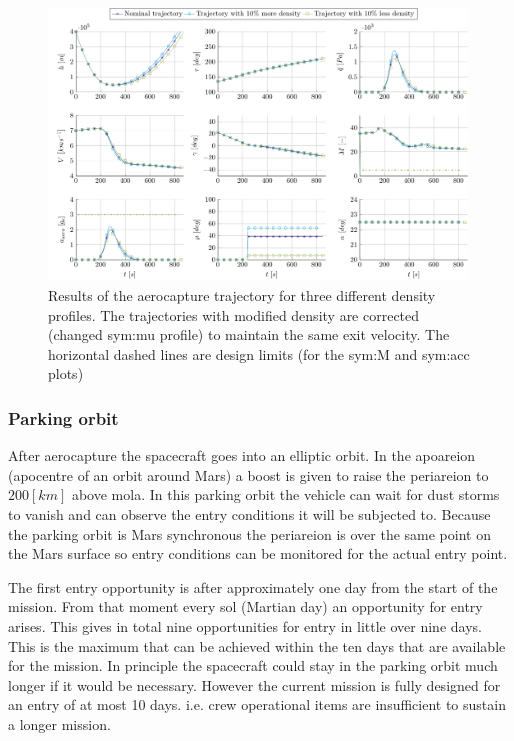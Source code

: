 \begin{figure}
	\centering
	\includegraphics[width=0.99\textwidth]{Figure/Orbit/sensitivity_aerocapture.pdf}
	\caption[Results of the aerocapture trajectory for three different density profiles]{Results of the aerocapture trajectory for three different density profiles. The trajectories with modified density are corrected (changed \gls{sym:mu} profile) to maintain the same exit velocity. The horizontal dashed lines are design limits (for the \gls{sym:M} and \gls{sym:acc} plots) }
	\label{fig:orbit_aerocapture_data}
\end{figure}

\subsubsection{Parking orbit}\label{sec:parking_orbit}
After aerocapture the spacecraft goes into an elliptic orbit. In the apoareion (apocentre of an orbit around Mars) a boost is given to raise the periareion to $200 \left[km\right]$ above \gls{mola}. In this parking orbit the vehicle can wait for dust storms to vanish and can observe the entry conditions it will be subjected to. Because the parking orbit is Mars synchronous the periareion is over the same point on the Mars surface so entry conditions can be monitored for the actual entry point.

The first entry opportunity is after approximately one day from the start of the mission. From that moment every sol (Martian day) an opportunity for entry arises. This gives in total nine opportunities for entry in little over nine days. This is the maximum that can be achieved within the ten days that are available for the mission. In principle the spacecraft could stay in the parking orbit much longer if it would be necessary. However the current mission is fully designed for an entry of at most 10 days. i.e. crew operational items are insufficient to sustain a longer mission.

